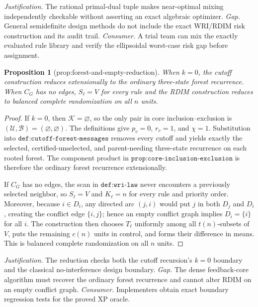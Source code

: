 \documentclass{article}
\newtheorem{proposition}{Proposition}
\begin{document}
\par\smallskip\noindent \textit{Justification.} The rational primal-dual tuple makes near-optimal mixing independently checkable without asserting an exact algebraic optimizer. \textit{Gap.} General semidefinite design methods do not include the exact WRI/RDIM risk construction and its audit trail. \textit{Consumer.} A trial team can mix the exactly evaluated rule library and verify the ellipsoidal worst-case risk gap before assignment.

\begin{proposition}[prop:forest-and-empty-reduction]\label{prop:forest-and-empty-reduction}
When \(k=0\), the cutoff construction reduces extensionally to the ordinary three-state forest recurrence. When \(C_G\) has no edges, \(S_{\ell}=V\) for every rule and the RDIM construction reduces to balanced complete randomization on all \(n\) units.
\end{proposition}
\begin{proof}
If \(k=0\), then \(\mathcal K=\varnothing\), so the only pair in core inclusion--exclusion is \((\mathcal U,\mathcal B)=(\varnothing,\varnothing)\).  The definitions give \(p_v=0\), \(r_v=1\), and \(\chi=1\).  Substitution into \(\texttt{def:cutoff-forest-messages}\) removes every cutoff and yields exactly the selected, certified-unselected, and parent-needing three-state recurrence on each rooted forest.  The component product in \(\texttt{prop:core-inclusion-exclusion}\) is therefore the ordinary forest recurrence extensionally.

If \(C_G\) has no edges, the scan in \(\texttt{def:wri-law}\) never encounters a previously selected neighbor, so \(S_\ell=V\) and \(K_\ell=n\) for every rule and priority order.  Moreover, because \(i\in D_i\), any directed arc \((j,i)\) would put \(j\) in both \(D_j\) and \(D_i\), creating the conflict edge \(\{i,j\}\); hence an empty conflict graph implies \(D_i=\{i\}\) for all \(i\).  The construction then chooses \(T_\ell\) uniformly among all \(t(n)\)-subsets of \(V\), puts the remaining \(c(n)\) units in control, and forms their difference in means.  This is balanced complete randomization on all \(n\) units.
\end{proof}
\par\smallskip\noindent \textit{Justification.} The reduction checks both the cutoff recursion's \(k=0\) boundary and the classical no-interference design boundary. \textit{Gap.} The dense feedback-core algorithm must recover the ordinary forest recurrence and cannot alter RDIM on an empty conflict graph. \textit{Consumer.} Implementers obtain exact boundary regression tests for the proved XP oracle.
\end{document}
